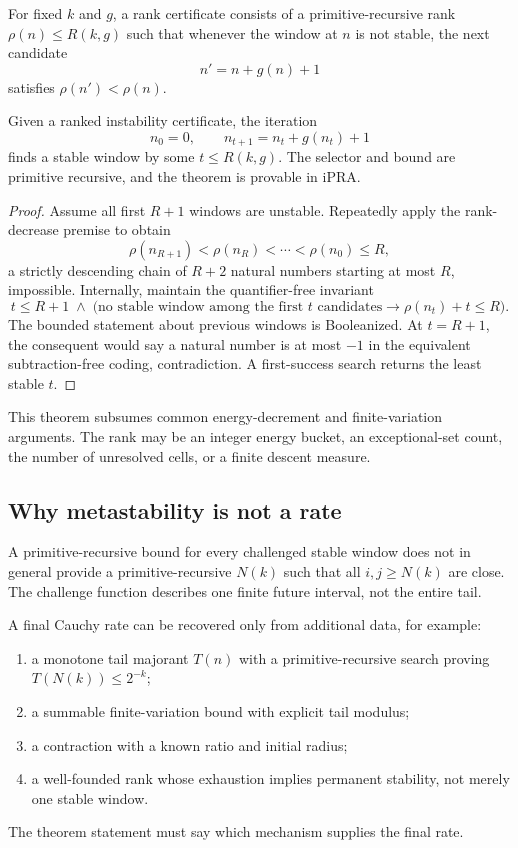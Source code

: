 \begin{definition}
For fixed $k$ and $g$, a rank certificate consists of a primitive-recursive rank $\rho(n)\le R(k,g)$ such that whenever the window at $n$ is not stable, the next candidate
\[
  n'=n+g(n)+1
\]
satisfies $\rho(n')<\rho(n)$.
\end{definition}

\begin{theorem}
\label{thm:rank-metastability}
Given a ranked instability certificate, the iteration
\[
 n_0=0,
 \qquad n_{t+1}=n_t+g(n_t)+1
\]
finds a stable window by some $t\le R(k,g)$.  The selector and bound are primitive recursive, and the theorem is provable in iPRA.
\end{theorem}

\begin{proof}
Assume all first $R+1$ windows are unstable.  Repeatedly apply the rank-decrease premise to obtain
\[
 \rho(n_{R+1})<\rho(n_R)<\cdots<\rho(n_0)\le R,
\]
a strictly descending chain of $R+2$ natural numbers starting at most $R$, impossible.  Internally, maintain the quantifier-free invariant
\[
  t\le R+1\;\wedge\;
  \bigl(\text{no stable window among the first $t$ candidates}
  \to \rho(n_t)+t\le R\bigr).
\]
The bounded statement about previous windows is Booleanized.  At $t=R+1$, the consequent would say a natural number is at most $-1$ in the equivalent subtraction-free coding, contradiction.  A first-success search returns the least stable $t$.
\end{proof}

This theorem subsumes common energy-decrement and finite-variation arguments.  The rank may be an integer energy bucket, an exceptional-set count, the number of unresolved cells, or a finite descent measure.

\subsection{Why metastability is not a rate}

\begin{warning}
\label{warn:meta-rate}
A primitive-recursive bound for every challenged stable window does not in general provide a primitive-recursive $N(k)$ such that all $i,j\ge N(k)$ are close.  The challenge function describes one finite future interval, not the entire tail.
\end{warning}

A final Cauchy rate can be recovered only from additional data, for example:
\begin{enumerate}[label=(\alph*)]
\item a monotone tail majorant $T(n)$ with a primitive-recursive search proving $T(N(k))\le2^{-k}$;
\item a summable finite-variation bound with explicit tail modulus;
\item a contraction with a known ratio and initial radius;
\item a well-founded rank whose exhaustion implies permanent stability, not merely one stable window.
\end{enumerate}
The theorem statement must say which mechanism supplies the final rate.


